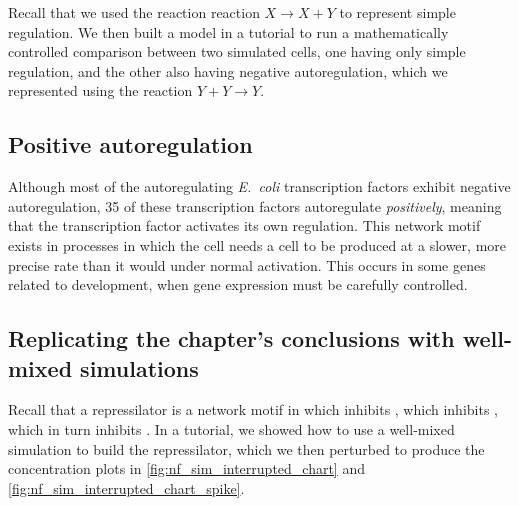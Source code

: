 Recall that we used the reaction reaction $X \rightarrow X + Y$ to represent simple regulation. We then built a model in a tutorial to run a mathematically controlled comparison between two simulated cells, one having only simple regulation, and the other also having negative autoregulation, which we represented using the reaction $Y + Y \rightarrow Y$.\\

\begin{exercise}\end{exercise}


\subsection{Positive autoregulation}

Although most of the autoregulating \textit{E.~coli} transcription factors exhibit negative autoregulation, 35 of these transcription factors autoregulate \textit{positively}, meaning that the transcription factor activates its own regulation. This network motif exists in processes in which the cell needs a cell to be produced at a slower, more precise rate than it would under normal activation. This occurs in some genes related to development, when gene expression must be carefully controlled.\\

\begin{exercise}\end{exercise}


\subsection{Replicating the chapter's conclusions with well-mixed simulations}

Recall that a repressilator is a network motif in which  inhibits , which inhibits , which in turn inhibits . In a tutorial, we showed how to use a well-mixed simulation to build the repressilator, which we then perturbed to produce the concentration plots in \autoref{fig:nf_sim_interrupted_chart} and \autoref{fig:nf_sim_interrupted_chart_spike}.\\

\begin{exercise}\end{exercise}
